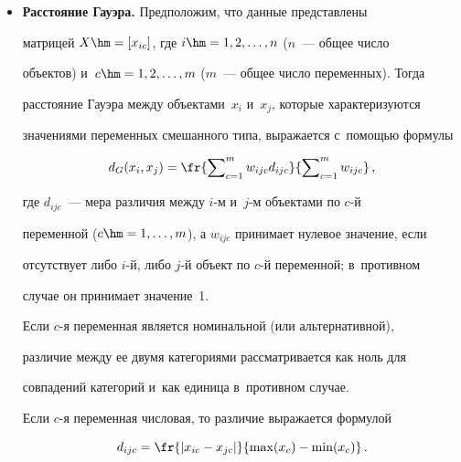   \begin{itemize} %


  \item[\textbf{1.}] \textbf{Расстояние Гауэра.} Предположим, что данные представлены 


матрицей $X\hm= [x_{ic}]$, где $i\hm = 1, 2, \ldots, n$ ($n$~--- общее число 


объектов) и~$c\hm = 1, 2, \ldots, m$ ($m$~--- общее число переменных). Тогда 


расстояние Гауэра между объектами~$x_i$ и~$x_j$, которые характеризуются 


значениями переменных смешанного типа, выражается с~помощью формулы


  \begin{equation}


  d_G(x_i,x_j) =\fr{\sum\nolimits^m_{c=1} w_{ijc} 


d_{ijc}}{\sum\nolimits^m_{c=1} w_{ijc}}\,,


  \label{e1-ad}


  \end{equation}


где $d_{ijc}$~--- мера различия между $i$-м и~$j$-м объектами по $c$-й 


переменной ($c \hm= 1, \ldots , m$), а $w_{ijc}$ принимает нулевое значение, если 


отсутствует либо $i$-й, либо $j$-й объект по $c$-й переменной; в~противном 


случае он принимает значение~1.


  


  Если $c$-я переменная является номинальной (или альтернативной), 


различие между ее двумя категориями рассматривается как ноль для 


совпадений категорий и~как единица в~противном случае.


  


  Если $c$-я переменная числовая, то различие выражается формулой


  \begin{equation}


  d_{ijc}=\fr{\vert x_{ic}- x_{jc}\vert}{\max(x_c)-\min(x_c)}\,.


  \label{e2-ad}


  \end{equation}



\end{itemize}
